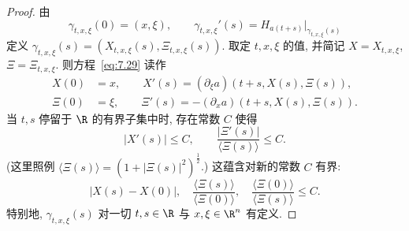 \begin{proof}
由
\begin{equation}\label{eq:7.29}
    \gamma_{t, x, \xi}(0) = (x, \xi), \qquad \gamma_{t, x, \xi}'(s) = H_{a(t+s)}|_{\gamma_{t, x, \xi}(s)}
\end{equation}
定义 $\gamma_{t, x, \xi}(s) = (X_{t, x, \xi}(s), \Xi_{t, x, \xi}(s))$. 取定 $t, x, \xi$ 的值, 并简记 $X = X_{t, x, \xi}$, $\Xi = \Xi_{t, x, \xi}$. 则方程~\eqref{eq:7.29} 读作
\begin{equation}\label{eq:7.30}
    \begin{aligned}
        X(0) &= x, \qquad X'(s) = (\partial_\xi a)(t + s, X(s), \Xi(s)), \\
        \Xi(0) &= \xi, \qquad \Xi'(s) = -(\partial_x a)(t + s, X(s), \Xi(s)).
    \end{aligned}
\end{equation}
当 $t, s$ 停留于 $\R$ 的有界子集中时, 存在常数 $C$ 使得
\begin{equation}\label{eq:7.31}
    | X'(s) | \le C, \qquad \frac{| \Xi'(s) |}{\langle \Xi(s) \rangle} \le C.
\end{equation}
(这里照例 $\langle \Xi(s) \rangle = (1 + | \Xi(s) |^2)^{\frac{1}{2}}$.) 这蕴含对新的常数 $C$ 有界:
\begin{equation}\label{eq:7.32}
    | X(s) - X(0) |, \quad \frac{\langle \Xi(s) \rangle}{\langle \Xi(0) \rangle}, \quad \frac{\langle \Xi(0) \rangle}{\langle \Xi(s) \rangle} \le C.
\end{equation}
特别地, $\gamma_{t, x, \xi}(s)$ 对一切 $t, s \in \R$ 与 $x, \xi \in \R^n$ 有定义.


\end{proof}
